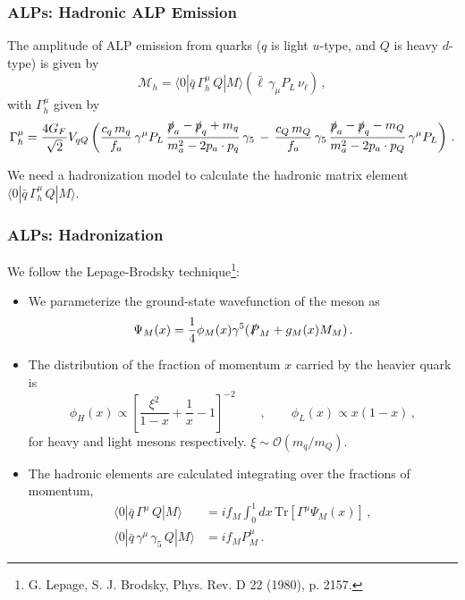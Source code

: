 \documentclass[mathserif, 10pt]{beamer}
\begin{document}
\begin{frame}\frametitle{ALPs: Hadronic ALP Emission}
    The amplitude of ALP emission from quarks ($q$ is light $u$-type, and $Q$ is heavy $d$-type) is given by
    $$\mathcal{M}_h = \langle 0 |\bar{q}\,\Gamma^\mu_{h}\,Q|M\rangle \left(\bar{\ell} \,\gamma_\mu P_L \,\nu_\ell \right)\,,$$
    with $\Gamma^\mu_h$ given by
        {\small $$\Gamma^\mu_h = \frac{4 G_F}{\sqrt{2}} V_{qQ}
                \left(\frac{c_q\,m_q}{f_a}\,\gamma^\mu P_L\,\frac{\slashed{p}_a-\slashed{p}_q+m_q}{m_a^2 -2 p_a \cdot p_q}\,\gamma_5
                \,-\, \frac{c_Q\,m_Q}{f_a}\,\gamma_5\,\frac{\slashed{p}_a-\slashed{p}_q-m_Q}{m_a^2- 2 p_a \cdot p_Q}\,\gamma^\mu P_L \right)\,.$$}

    We need a hadronization model to calculate the hadronic matrix element $ \langle 0 |\bar{q}\,\Gamma^\mu_{h}\,Q|M\rangle$.

\end{frame}

\begin{frame}\frametitle{ALPs: Hadronization}
    We follow the Lepage-Brodsky technique\footnote[18]{G. Lepage, S. J. Brodsky, Phys. Rev. D 22 (1980), p. 2157.}:
    \begin{itemize}
        \item We parameterize the ground-state wavefunction of the meson as
              $$\Psi_M(x)=\frac{1}{4}\phi_M(x)\gamma^5(\slashed{P}_M + g_M(x) M_M)\,.$$
        \item The distribution of the fraction of momentum $x$ carried by the heavier quark is
              $$\phi_H(x) \propto  \left[\frac{\xi^2}{1-x}+\frac{1}{x}-1\right]^{-2} \qquad , \qquad \phi_L(x) \propto  x(1-x) \,,$$
              for heavy and light mesons respectively. $\xi\sim \mathcal{O}(m_q/m_Q)$.
        \item The hadronic elements are calculated integrating over the fractions of momentum,
              \begin{align*}
                  \langle 0| \bar{q}\,\Gamma^{\mu}\,Q |M\rangle          & = i f_M \int_0^1 dx\,\mathrm{Tr}\left[\Gamma^{\mu} \Psi_M (x)\right]\,, \\
                  \langle 0|\bar{q}\,\gamma^\mu \,\gamma_5 \,Q |M\rangle & = i f_M P_M^\mu \,.
              \end{align*}

    \end{itemize}
\end{frame}
\end{document}
